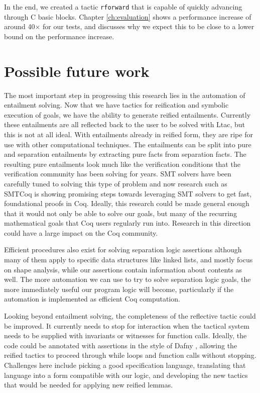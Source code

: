 \documentclass{puthesis}
\begin{document}
In the end, we created a tactic \lstinline|rforward| that is capable
of quickly advancing through C basic blocks. Chapter
\ref{ch:evaluation} shows a performance increase of around 40$\times$
for our tests, and discusses why we expect this to be close to a lower
bound on the performance increase. 

\section{Possible future work}

The most important step in progressing this research lies in the
automation of entailment solving. Now that we have tactics for
reification and symbolic execution of goals, we have the ability to
generate reified entailments. Currently these entailments are all
reflected back to the user to be solved with Ltac, but this is not at
all ideal. With entailments already in reified form, they are ripe for
use with other computational techniques. The entailments can be split
into pure and separation entailments by extracting pure facts from
separation facts. The resulting pure entailments look much like the
verification conditions that the verification community has been
solving for years. SMT solvers have been carefully tuned to solving
this type of problem and now research such as SMTCoq \cite{smtcoq} is
showing promising steps towards leveraging SMT solvers to get fast,
foundational proofs in Coq. Ideally, this research could be made
general enough that it would not only be able to solve our goals, but
many of the recurring mathematical goals that Coq users regularly run
into. Research in this direction could have a large impact on the Coq
community.

Efficient procedures also exist for solving separation logic
assertions \cite{DBLP:conf/vmcai/NguyenDQC07,
  Brotherston-Distefano-Petersen:11, navarro11, cook11} although many
of them apply to specific data structures like linked lists, and mostly
focus on shape analysis, while our assertions contain information
about contents as well. The more automation we can use to try to solve
separation logic goals, the more immediately useful our program logic
will become, particularly if the automation is implemented as
efficient Coq computation.

Looking beyond entailment solving, the completeness of the reflective
tactic could be improved. It currently needs to stop for interaction
when the tactical system needs to be supplied with invariants or
witnesses for function calls. Ideally, the code could be annotated
with assertions in the style of Dafny \cite{leino2010dafny}, allowing
the reified tactics to proceed through while loops and function calls
without stopping. Challenges here include picking a good specification
language, translating that language into a form compatible with our
logic, and developing the new tactics that would be needed for
applying new reified lemmas. 
\end{document}
